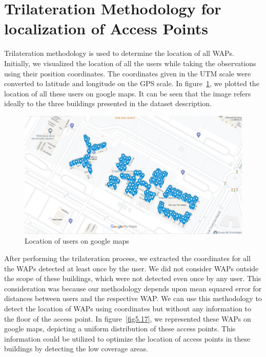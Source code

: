 \documentclass[a4paper,singleside,12pt]{report} %
\begin{document}
		\section{Trilateration Methodology for localization of Access Points}

			Trilateration methodology is used to determine the location of all WAPs. 
			Initially, we visualized the location of all the users while taking the observations using their position coordinates. 
			The coordinates given in the UTM scale were converted to latitude and longitude on the GPS scale. 
			In figure~\ref{fig5.16}, we plotted the location of all these users on google maps. 
			It can be seen that the image refers ideally to the three buildings presented in the dataset description.
		
		\begin{figure}[htb!]
			\centering
			\includegraphics[width=1\linewidth]{./figures/google_maps_users.png}
			\caption{Location of users on google maps}
			 \label{fig5.16}
		\end{figure}
		
			After performing the trilateration process, we extracted the coordinates for all the WAPs detected at least once by the user. 
			We did not consider WAPs outside the scope of these buildings, which were not detected even once by any user. 
			This consideration was because our methodology depends upon mean squared error for distances between users and the respective WAP. 
			We can use this methodology to detect the location of WAPs using coordinates but without any information to the floor of the access point. 
			In figure~\ref{fig5.17}, we represented these WAPs on google maps, depicting a uniform distribution of these access points. 
			This information could be utilized to optimize the location of access points in these buildings by detecting the low coverage areas.
\end{document}
